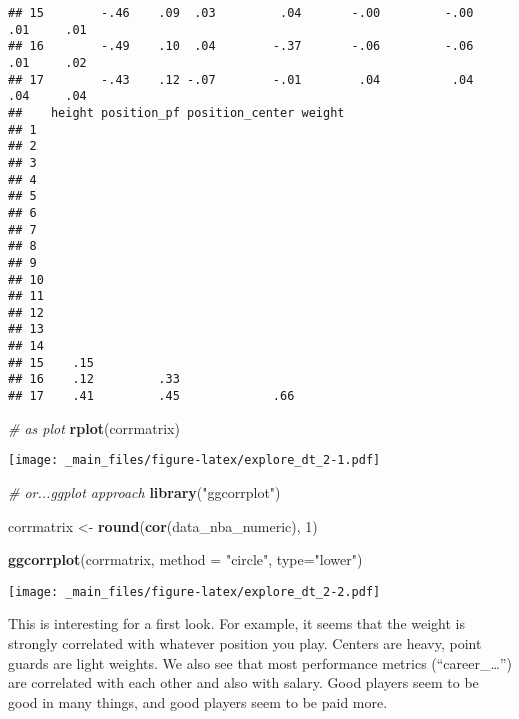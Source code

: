 \documentclass[
]{book}
\newenvironment{Shaded}{\begin{snugshade}}{\end{snugshade}}
\newcommand{\AttributeTok}[1]{\textcolor[rgb]{0.13,0.29,0.53}{#1}}
\newcommand{\CommentTok}[1]{\textcolor[rgb]{0.56,0.35,0.01}{\textit{#1}}}
\newcommand{\DecValTok}[1]{\textcolor[rgb]{0.00,0.00,0.81}{#1}}
\newcommand{\FunctionTok}[1]{\textcolor[rgb]{0.13,0.29,0.53}{\textbf{#1}}}
\newcommand{\NormalTok}[1]{#1}
\newcommand{\OtherTok}[1]{\textcolor[rgb]{0.56,0.35,0.01}{#1}}
\newcommand{\StringTok}[1]{\textcolor[rgb]{0.31,0.60,0.02}{#1}}
\begin{document}
\begin{verbatim}
## 15        -.46    .09  .03         .04       -.00         -.00     .01     .01
## 16        -.49    .10  .04        -.37       -.06         -.06     .01     .02
## 17        -.43    .12 -.07        -.01        .04          .04     .04     .04
##    height position_pf position_center weight
## 1                                           
## 2                                           
## 3                                           
## 4                                           
## 5                                           
## 6                                           
## 7                                           
## 8                                           
## 9                                           
## 10                                          
## 11                                          
## 12                                          
## 13                                          
## 14                                          
## 15    .15                                   
## 16    .12         .33                       
## 17    .41         .45             .66
\end{verbatim}

\begin{Shaded}
\begin{Highlighting}[]
\CommentTok{\# as plot}
\FunctionTok{rplot}\NormalTok{(corrmatrix)}
\end{Highlighting}
\end{Shaded}

\texttt{[image: \_main\_files/figure-latex/explore\_dt\_2-1.pdf]}

\begin{Shaded}
\begin{Highlighting}[]
\CommentTok{\# or...ggplot approach}
\FunctionTok{library}\NormalTok{(}\StringTok{"ggcorrplot"}\NormalTok{)}

\NormalTok{corrmatrix }\OtherTok{\textless{}{-}} \FunctionTok{round}\NormalTok{(}\FunctionTok{cor}\NormalTok{(data\_nba\_numeric), }\DecValTok{1}\NormalTok{)}

\FunctionTok{ggcorrplot}\NormalTok{(corrmatrix,}
           \AttributeTok{method =} \StringTok{"circle"}\NormalTok{,}
           \AttributeTok{type=}\StringTok{"lower"}\NormalTok{)}
\end{Highlighting}
\end{Shaded}

\texttt{[image: \_main\_files/figure-latex/explore\_dt\_2-2.pdf]}

This is interesting for a first look. For example, it seems that the weight is
strongly correlated with whatever position you play. Centers are heavy, point
guards are light weights.
We also see that most performance metrics (``career\_\ldots{}'') are correlated with each
other and also with salary. Good players seem to be good in many things, and
good players seem to be paid more.
\end{document}
